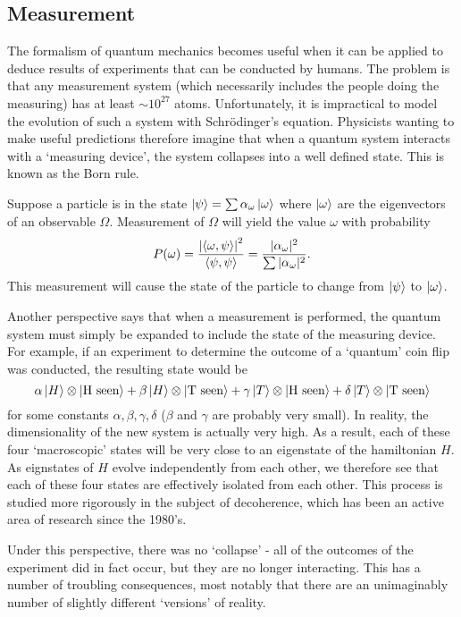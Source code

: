 \documentclass[a4paper]{article}
\begin{document}
\subsection{Measurement}
The formalism of quantum mechanics becomes useful when it can be applied to deduce results of experiments that can be conducted by humans. The problem is that any measurement system (which necessarily includes the people doing the measuring) has at least $\sim 10^{27}$ atoms. Unfortunately, it is impractical to model the evolution of such a system with Schr\"{o}dinger's equation. Physicists wanting to make useful predictions therefore imagine that when a quantum system interacts with a `measuring device', the system collapses into a well defined state. This is known as the Born rule.

\begin{princ}
    Suppose a particle is in the state $\left\lvert \psi \right\rangle = \sum \alpha_\omega \left\lvert \omega \right\rangle$ where $\left\lvert \omega \right\rangle$ are the eigenvectors of an observable $\Omega$. Measurement of $\Omega$ will yield the value $\omega$ with probability $$P(\omega) = \frac{\left\lvert \left\langle \omega , \psi \right\rangle \right\rvert^2}{\left\langle \psi , \psi \right\rangle} = \frac{|\alpha_\omega|^2}{\sum |\alpha_\omega|^2}.$$ This measurement will cause the state of the particle to change from $\left\lvert \psi \right\rangle$ to $\left\lvert \omega \right\rangle$.
\end{princ}

Another perspective says that when a measurement is performed, the quantum system must simply be expanded to include the state of the measuring device. For example, if an experiment to determine the outcome of a `quantum' coin flip was conducted, the resulting state would be $$\alpha \left\lvert H \right\rangle\otimes\left\lvert \text{H seen} \right\rangle + \beta \left\lvert H \right\rangle\otimes\left\lvert \text{T seen} \right\rangle + \gamma \left\lvert T \right\rangle\otimes\left\lvert \text{H seen} \right\rangle + \delta \left\lvert T \right\rangle\otimes\left\lvert \text{T seen} \right\rangle$$ for some constants $\alpha, \beta, \gamma, \delta$ ($\beta$ and $\gamma$ are probably very small). In reality, the dimensionality of the new system is actually very high. As a result, each of these four `macroscopic' states will be very close to an eigenstate of the hamiltonian $H$. As eignstates of $H$ evolve independently from each other, we therefore see that each of these four states are effectively isolated from each other. This process is studied more rigorously in the subject of decoherence, which has been an active area of research since the 1980's.

Under this perspective, there was no `collapse' - all of the outcomes of the experiment did in fact occur, but they are no longer interacting. This has a number of troubling consequences, most notably that there are an unimaginably number of slightly different `versions' of reality. 
\end{document}

